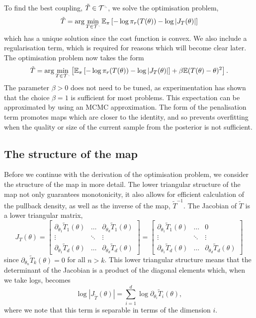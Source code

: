 \documentclass[final]{siamltex}
\newcommand{\ltri}{%
\,\resizebox{!}{0.25\baselineskip}{%
\begin{tikzpicture}%
\draw[line width=1mm](0,0) -- (0,2) -- (2,0)  -- (0,0);
\end{tikzpicture}%
}\xspace%
}%
\newcommand{\smallltri}{%
\,\resizebox{!}{0.15\baselineskip}{%
\begin{tikzpicture}%
\draw[line width=1mm](0,0) -- (0,2) -- (2,0)  -- (0,0);
\end{tikzpicture}%
}\xspace%
}%
\begin{document}
To find the best coupling, $\tilde{T} \in \mathcal{T}^{\ltri}$, we solve the optimisation problem,
\[
	\tilde{T} = \arg\min_{T \in \mathcal{T}^{\smallltri}} \mathbb{E}_\pi\left[-\log\pi_r(T(\theta)) -
		\log\left|J_T(\theta)\right|\right]
\]
which has a unique solution since the cost function is convex. We also include a regularisation term, which is required for reasons which will become clear later. The optimisation problem now takes the form
\begin{equation}\label{eq:gen_map_optim}
	\tilde{T} = \arg\min_{T\in\mathcal{T}^{\smallltri}} \left[
		 \mathbb{E}_\pi\left[-\log\pi_r(T(\theta)) -
		\log\left|J_T(\theta)\right|\right] + \beta\mathbb{E}(T(\theta)- \theta)^2 \right].
\end{equation}
The parameter $\beta>0$ does not need to be tuned, as experimentation has shown that the choice
$\beta=1$ is sufficient for most problems. This expectation can be
approximated by using an MCMC approximation. The form of the penalisation term promotes maps which are
closer to the identity, and so prevents overfitting when the quality
or size of the current sample from the posterior is not sufficient.

\subsection{The structure of the map}

Before we continue with the derivation of the optimisation problem, we consider the structure
of the map in more detail. The lower triangular structure of the map not only guarantees monotonicity, it also allows for efficient calculation of the pullback density, as well as the inverse of the map, $\tilde{T}^{-1}$. The Jacobian of $\tilde{T}$ is a lower triangular matrix,
\[
	J_T(\theta) = \begin{bmatrix}
		\partial_{\theta_1} \tilde{T}_1(\theta) & \dots & \partial_{\theta_d} \tilde{T}_1(\theta)\\
		\vdots & \ddots & \vdots \\
		\partial_{\theta_1} \tilde{T}_d(\theta) & \dots & \partial_{\theta_d} \tilde{T}_d(\theta)
	\end{bmatrix} = \begin{bmatrix}
		\partial_{\theta_1} \tilde{T}_1(\theta) & \dots & 0\\
		\vdots & \ddots & \vdots \\
		\partial_{\theta_1} \tilde{T}_d(\theta) & \dots & \partial_{\theta_d} \tilde{T}_d(\theta)
	\end{bmatrix}
\]
since $\partial_{\theta_n} \tilde{T}_k(\theta) = 0$ for all $n > k$. This lower triangular structure means that the determinant of the Jacobian is a product of the diagonal elements which, when we take logs, becomes
\begin{equation}\label{eqn:separable_jacobian}
	\log\left|J_{\tilde{T}}(\theta)\right| = \sum\limits_{i=1}^d \! \log \partial_{\theta_i} \tilde{T}_i(\theta),
\end{equation}
where we note that this term is separable in terms of the dimension $i$.
\end{document}

